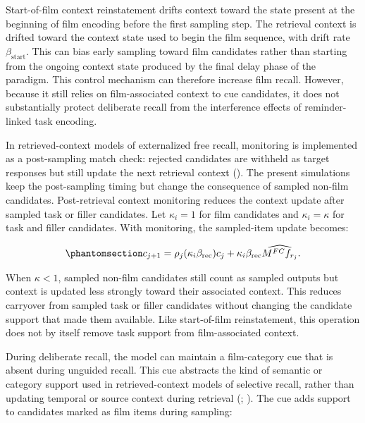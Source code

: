 \documentclass[
  man,
  floatsintext,
  longtable,
  nolmodern,
  notxfonts,
  notimes,
  draftfirst,
  colorlinks=true,linkcolor=blue,citecolor=blue,urlcolor=blue]{apa7}
\begin{document}
Start-of-film context reinstatement drifts context toward the state
present at the beginning of film encoding before the first sampling
step. The retrieval context is drifted toward the context state used to
begin the film sequence, with drift rate \(\beta_{\mathrm{start}}\).
This can bias early sampling toward film candidates rather than starting
from the ongoing context state produced by the final delay phase of the
paradigm. This control mechanism can therefore increase film recall.
However, because it still relies on film-associated context to cue
candidates, it does not substantially protect deliberate recall from the
interference effects of reminder-linked task encoding.

In retrieved-context models of externalized free recall, monitoring is
implemented as a post-sampling match check: rejected candidates are
withheld as target responses but still update the next retrieval context
(). The present
simulations keep the post-sampling timing but change the consequence of
sampled non-film candidates. Post-retrieval context monitoring reduces
the context update after sampled task or filler candidates. Let
\(\kappa_i = 1\) for film candidates and \(\kappa_i = \kappa\) for task
and filler candidates. With monitoring, the sampled-item update becomes:

\begin{equation}\phantomsection\label{eq-monitoring-update}{
c_{j+1} =
\rho_j(\kappa_i \beta_{\mathrm{rec}}) c_j +
\kappa_i \beta_{\mathrm{rec}} \widehat{M^{FC} f_{r_j}} .
}\end{equation}

When \(\kappa < 1\), sampled non-film candidates still count as sampled
outputs but context is updated less strongly toward their associated
context. This reduces carryover from sampled task or filler candidates
without changing the candidate support that made them available. Like
start-of-film reinstatement, this operation does not by itself remove
task support from film-associated context.

During deliberate recall, the model can maintain a film-category cue
that is absent during unguided recall. This cue abstracts the kind of
semantic or category support used in retrieved-context models of
selective recall, rather than updating temporal or source context during
retrieval (;
). The cue adds
support to candidates marked as film items during sampling:
\end{document}
